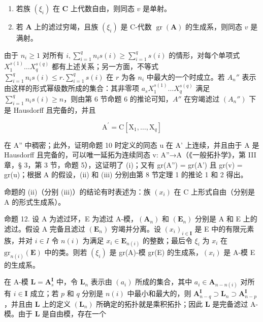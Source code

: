 \begin{enumerate}
\def\labelenumi{(\roman{enumi})}
\setcounter{enumi}{1}
\item
  若族 \((\xi_{i})\) 在 \(\mathbf{C}\) 上代数自由，则同态 \(v\) 是单射。
\item
  若 \(\mathbf{A}\) 上的滤过穷竭，且族 \((\xi_{i})\) 是 C-代数 \(\operatorname{gr}(\mathbf{A})\) 的生成系，则同态 \(v\) 是满射。
\end{enumerate}

	由于 \(n_i \geqslant 1\) 对所有 \(i, \sum_{i=1}^{q} n_i s(i) \geqslant \sum_{i=1}^{q} s(i)\) 的情形，对每个单项式 \(X_1^{s(1)} \ldots X_q^{s(q)}\) 都有上述关系；另一方面，不等式 \(\sum_{i=1}^{q} n_i s(i) \leqslant r. \sum_{i=1}^{q} s(i)\) 在 \(r\) 为各 \(n_i\) 中最大的一个时成立。若 \(A_n''\) 表示由这样的形式幂级数所成的集合：其非零项 \(a_s X_1^{s(1)} \ldots X_q^{s(q)}\) 满足 \(\sum_{i=1}^{q} n_i s(i) \geqslant n\)，则由第 6 节命题 6 的推论可知，\(A''\) 在穷竭滤过 \((A_n'')\) 下是 Hausdorff 且完备的，并且

\[
\mathrm{A} ^ {\prime} = \mathrm{C} [ \mathrm{X} _ {1}, \dots , \mathrm{X} _ {q} ]
\]

在 A'' 中稠密；此外，证明命题 10 时定义的同态 u 在 A' 上连续，并且由于 A 是 Hausdorff 且完备的，可以唯一延拓为连续同态 v: A''→A（《一般拓扑学》，第 III 章，§ 3，第 3 节，命题 5），这证明了 (i)；又有 gr(A'') = gr(A') 且 gr(v) = gr(u)；根据 A 的假设，(ii) 和 (iii) 分别由第 8 节定理 1 的推论 1 和 2 得出。

命题的 (ii)（分别 (iii)）的结论有时表述为：族 \((x_{i})\) 在 C 上形式自由（分别是 A 的形式生成系）。

命题 12. 设 A 为滤过环，E 为滤过 A-模，\((\mathbf{A}_{n})\) 和 \((\mathbf{E}_{n})\) 分别是 A 和 E 上的滤过。假设 A 完备且滤过 \((\mathbf{E}_{n})\) 穷竭并分离。设 \((x_{i})_{i\in\mathbf{I}}\) 是 E 中的有限元素族，并对 \(i\in I\) 令 \(n(i)\) 为满足 \(x_{i}\in\mathbf{E}_{n(i)}\) 的整数；最后令 \(\xi_{i}\) 为 \(x_{i}\) 在 \(\mathrm{gr}_{n(i)}(\mathbf{E})\) 中的类。则若 \((\xi_{i})\) 是 gr(A)-模 gr(E) 的生成系，\((x_{i})\) 是 A-模 E 的生成系。

	在 A-模 \(\mathbf{L} = \mathbf{A}_s^{\mathbf{I}}\) 中，令 \(\mathbf{L}_n\) 表示由 \((a_i)\) 所成的集合，其中 \(a_i \in \mathbf{A}_{n - n(i)}\) 对所有 \(i \in \mathbf{I}\) 成立；若 \(p\) 和 \(q\) 分别是 \(n(i)\) 中最小和最大的，则 \(\mathbf{A}_{n - q}^{\mathbf{I}} \supset \mathbf{L}_n \supset \mathbf{A}_{n - p}^{\mathbf{I}}\)，并且由 \(\mathbf{L}\) 上的定义 \((\mathbf{L}_n)\) 所确定的拓扑就是乘积拓扑；因此 \(\mathbf{L}\) 是完备滤过 A-模。由于 \(\mathbf{L}\) 是自由模，存在一个

